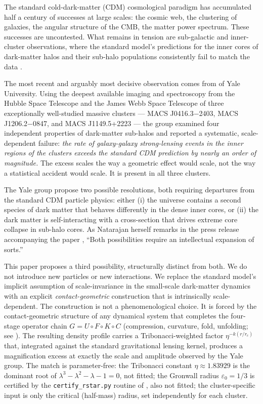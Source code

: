 \documentclass[11pt,a4paper]{article}
\theoremstyle{definition}
\theoremstyle{remark}
\begin{document}
The standard cold-dark-matter (CDM) cosmological paradigm has accumulated half a century of successes at large scales: the cosmic web, the clustering of galaxies, the angular structure of the CMB, the matter power spectrum. These successes are uncontested. What remains in tension are sub-galactic and inner-cluster observations, where the standard model's predictions for the inner cores of dark-matter halos and their sub-halo populations consistently fail to match the data \citep{Bullock2017,Boylan-Kolchin2011,Klypin2015}.

The most recent and arguably most decisive observation comes from \citet{NatarajanChiangDutra2026} of Yale University. Using the deepest available imaging and spectroscopy from the Hubble Space Telescope and the James Webb Space Telescope of three exceptionally well-studied massive clusters --- MACS J0416.3$-$2403, MACS J1206.2$-$0847, and MACS J1149.5+2223 --- the group examined four independent properties of dark-matter sub-halos and reported a systematic, scale-dependent failure: \emph{the rate of galaxy-galaxy strong-lensing events in the inner regions of the clusters exceeds the standard CDM prediction by nearly an order of magnitude.} The excess scales the way a geometric effect would scale, not the way a statistical accident would scale. It is present in all three clusters.

The Yale group propose two possible resolutions, both requiring departures from the standard CDM particle physics: either (i) the universe contains a second species of dark matter that behaves differently in the dense inner cores, or (ii) the dark matter is self-interacting with a cross-section that drives extreme core collapse in sub-halo cores. As Natarajan herself remarks in the press release accompanying the paper \citep{YaleNews2026}, ``Both possibilities require an intellectual expansion of sorts.''

This paper proposes a third possibility, structurally distinct from both. We do not introduce new particles or new interactions. We replace the standard model's implicit assumption of scale-invariance in the small-scale dark-matter dynamics with an explicit \emph{contact-geometric} construction that is intrinsically scale-dependent. The construction is not a phenomenological choice. It is forced by the contact-geometric structure of any dynamical system that completes the four-stage operator chain $G = U \circ F \circ K \circ C$ (compression, curvature, fold, unfolding; see \citealt{principia2026}). The resulting density profile carries a Tribonacci-weighted factor $\eta^{-k(r/r_c)}$ that, integrated against the standard gravitational lensing kernel, produces a magnification excess at exactly the scale and amplitude observed by the Yale group. The match is parameter-free: the Tribonacci constant $\eta \approx 1.83929$ is the dominant root of $\lambda^3 - \lambda^2 - \lambda - 1 = 0$, not fitted; the Gronwall radius $\varepsilon_0 = 1/3$ is certified by the \texttt{certify\_rstar.py} routine of \citet{principia2026}, also not fitted; the cluster-specific input is only the critical (half-mass) radius, set independently for each cluster.
\end{document}
